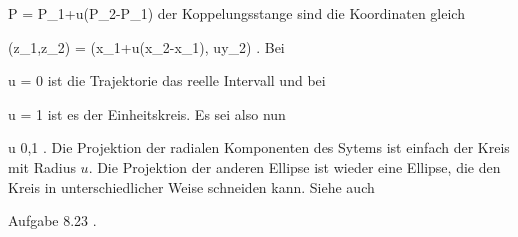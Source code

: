 {\mavergleichskette
{\vergleichskette
{ P
}
{ = }{ P_1+u(P_2-P_1)
}
{  }{
}
{    }{
}
{   }{
}
}
{}{}{}
der Koppelungsstange sind die Koordinaten gleich

\mavergleichskettedisp
{\vergleichskette
{ (z_1,z_2)
}
{ =} { (x_1+u(x_2-x_1), uy_2)
}
{ } {
}
{ } {
}
{ } {
}
}
{}{}{.}
Bei

\mavergleichskette
{\vergleichskette
{ u
}
{ = }{ 0
}
{  }{
}
{    }{
}
{   }{
}
}
{}{}{}
ist die Trajektorie das reelle Intervall
\mathl{[-2,2]}{,} und bei

\mavergleichskette
{\vergleichskette
{ u
}
{ = }{ 1
}
{  }{
}
{    }{
}
{   }{
}
}
{}{}{}
ist es der Einheitskreis. Es sei also nun

\mavergleichskette
{\vergleichskette
{ u
}
{ \neq }{ 0,1
}
{  }{
}
{    }{
}
{   }{
}
}
{}{}{.}
Die Projektion der radialen Komponenten des Sytems ist einfach der Kreis mit Radius $u$. Die Projektion der anderen Ellipse ist wieder eine Ellipse, die den Kreis in unterschiedlicher Weise schneiden kann. Siehe auch

Aufgabe 8.23
.





}
